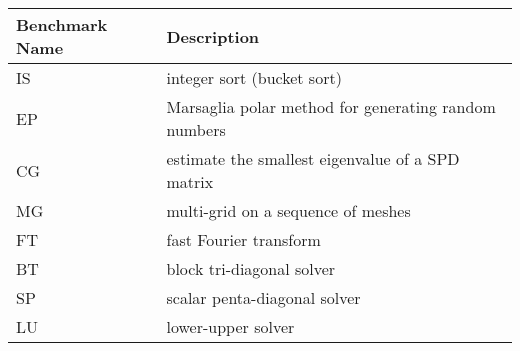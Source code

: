 \begin{tabular}{|l|l|}
    \hline
    \textbf{Benchmark Name} & \textbf{Description}                                 \\ \hline
    IS                      & integer sort (bucket sort)                           \\ \hline
    EP                      & Marsaglia polar method for generating random numbers \\ \hline
    CG                      & estimate the smallest eigenvalue of a SPD matrix     \\ \hline
    MG                      & multi-grid on a sequence of meshes                   \\ \hline
    FT                      & fast Fourier transform                               \\ \hline
    BT                      & block tri-diagonal solver                            \\ \hline
    SP                      & scalar penta-diagonal solver                         \\ \hline
    LU                      & lower-upper solver                                   \\ \hline
\end{tabular}